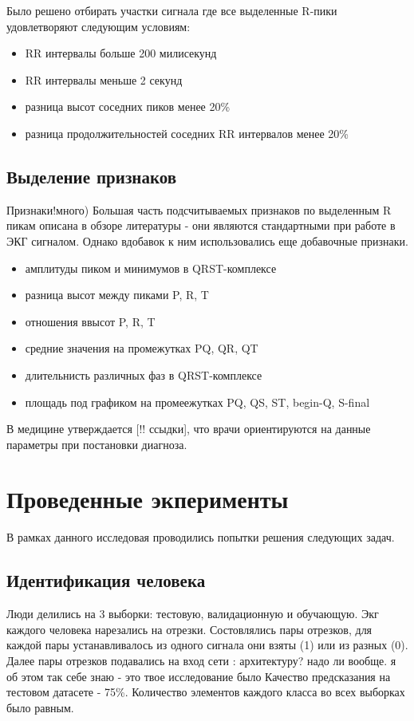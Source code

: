 Было решено отбирать участки сигнала где все выделенные R-пики удовлетворяют следующим условиям:

\begin{itemize}
	\item RR интервалы больше 200 милисекунд
	\item RR интервалы меньше 2 секунд
	\item разница высот соседних пиков менее 20\%
	\item разница продолжительностей соседних RR интервалов менее 20\%
\end{itemize}
\subsection{Выделение признаков}
Признаки!много)
Большая часть подсчитываемых признаков по выделенным R пикам описана в обзоре литературы - они являются стандартными при работе в ЭКГ сигналом. Однако вдобавок к ним использовались еще добавочные признаки.
\begin{itemize}
	\item амплитуды пиком и минимумов в QRST-комплексе
	\item разница высот между пиками P, R, T
	\item отношения ввысот P, R, T
	\item средние значения на промежутках PQ, QR, QT
	\item длительнисть различных фаз в QRST-комплексе
	\item площадь под графиком на промеежутках PQ, QS, ST, begin-Q, S-final
\end{itemize}
В медицине утверждается [!! ссыдки], что врачи ориентируются на данные параметры при постановки диагноза.
\section{Проведенные экперименты}
В рамках данного исследовая проводились попытки решения следующих задач.
\subsection{Идентификация человека}
Люди делились на 3 выборки: тестовую, валидационную и обучающую. Экг каждого человека нарезались на отрезки. Состовлялись пары отрезков, для каждой пары устанавливалось из одного сигнала они взяты (1) или из разных (0). Далее пары отрезков подавались на вход сети :
 архитектуру? надо ли вообще. я об этом так себе знаю - это твое исследование было
Качество предсказания на тестовом датасете - 75\%. Количество элементов каждого класса во всех выборках было равным.
